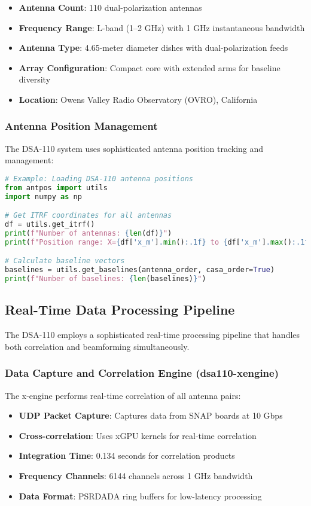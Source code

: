 \documentclass[11pt]{article}
\begin{document}
\begin{itemize}
    \item \textbf{Antenna Count}: 110 dual-polarization antennas
    \item \textbf{Frequency Range}: L-band (1--2 GHz) with 1 GHz instantaneous bandwidth
    \item \textbf{Antenna Type}: 4.65-meter diameter dishes with dual-polarization feeds
    \item \textbf{Array Configuration}: Compact core with extended arms for baseline diversity
    \item \textbf{Location}: Owens Valley Radio Observatory (OVRO), California
\end{itemize}

\subsubsection{Antenna Position Management}
The DSA-110 system uses sophisticated antenna position tracking and management:

\begin{lstlisting}[language=Python]
# Example: Loading DSA-110 antenna positions
from antpos import utils
import numpy as np

# Get ITRF coordinates for all antennas
df = utils.get_itrf()
print(f"Number of antennas: {len(df)}")
print(f"Position range: X={df['x_m'].min():.1f} to {df['x_m'].max():.1f} m")

# Calculate baseline vectors
baselines = utils.get_baselines(antenna_order, casa_order=True)
print(f"Number of baselines: {len(baselines)}")
\end{lstlisting}

\subsection{Real-Time Data Processing Pipeline}

The DSA-110 employs a sophisticated real-time processing pipeline that handles both correlation and beamforming simultaneously.

\subsubsection{Data Capture and Correlation Engine (dsa110-xengine)}
The x-engine performs real-time correlation of all antenna pairs:

\begin{itemize}
    \item \textbf{UDP Packet Capture}: Captures data from SNAP boards at 10 Gbps
    \item \textbf{Cross-correlation}: Uses xGPU kernels for real-time correlation
    \item \textbf{Integration Time}: 0.134 seconds for correlation products
    \item \textbf{Frequency Channels}: 6144 channels across 1 GHz bandwidth
    \item \textbf{Data Format}: PSRDADA ring buffers for low-latency processing
\end{itemize}
\end{document}
